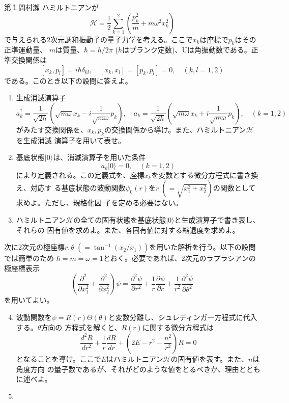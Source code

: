 \begin{question}{第１問}{村瀬}
ハミルトニアンが
\[
  \mathcal{H}=\frac12\sum_{k=1}^2\left(\frac{p_k^2}m + m \omega^2 x_k^2\right)
\]
で与えられる2次元調和振動子の量子力学を考える。ここで$x_k$は座標で$p_k$はその正準運動量、
$m$は質量、$\hbar=h/2\pi$ ($h$はプランク定数)、Uは角振動数である。正準交換関係は
\[
  [x_k,p_l] = i\hbar\delta_{kl},\quad
  [x_k,x_l] = [p_k,p_l] = 0,\quad
  (k,l=1,2)
\]
である。このとき以下の設問に答えよ。
\begin{enumerate}
\item
  生成消滅演算子
  \[
    a_k^\dag = \frac1{\sqrt{2h}}\left(\sqrt{m\omega}x_k - i \frac1{\sqrt{m\omega}} p_k\right),\quad
    a_k      = \frac1{\sqrt{2h}}\left(\sqrt{m\omega}x_k + i \frac1{\sqrt{m\omega}} p_k\right),\quad
    (k=1,2)
  \]
  がみたす交換関係を、$x_k,p_k$の交換関係から導け。また、ハミルトニアン$\mathcal{H}$を生成消滅
  演算子を用いて表せ。
\item{}
  基底状態$|0\rangle$は、消滅演算子を用いた条件
  \[
    a_k|0\rangle=0,\quad (k=1,2)
  \]
  により定義される。この定義式を、座標$x_k$を変数とする微分方程式に書き換え、対応す
  る基底状態の波動関数$\psi_0(r)$を$r\;(=\sqrt{x_1^2+x_2^2})$の関数として求めよ。ただし、規格化因
  子を定める必要はない。
\item{}
  ハミルトニアン$\mathcal{H}$の全ての固有状態を基底状態$|0\rangle$と生成演算子で書き表し、それらの
  固有値を求めよ。また、各固有値に対する縮退度を求めよ。
\end{enumerate}
次に2次元の極座標$r,\theta\;(=\tan^{-1}(x_2/x_1))$を用いた解析を行う。以下の設問では簡単のため
$\hbar=m=\omega=1$とおく。必要であれば、2次元のラプラシアンの極座標表示
\[
  \left(\frac{\partial^2}{\partial x_1^2} + \frac{\partial^2}{\partial x_2^2}\right)\psi
  = \frac{\partial^2\psi}{\partial r^2}
  + \frac1r\frac{\partial\psi}{\partial r}
  + \frac1{r^2}\frac{\partial^2\psi}{\partial\theta^2}
\]
を用いてよい。
\begin{enumerate}
\setcounter{enumi}{3}
\item
  波動関数を$\psi=R(r)\Theta(\theta)$と変数分離し、シュレディンガ一方程式に代入する。$\theta$方向の
  方程式を解くと、$R(r)$に関する微分方程式は
  \[
    \frac{d^2R}{dr^2} + \frac1r\frac{dR}{dr}
    + \left(2E-r^2-\frac{n^2}{r^2}\right) R = 0
  \]
  となることを導け。ここで$E$はハミルトニアン$\mathcal{H}$の固有値を表す。また、$n$は角度方向
  の量子数であるが、それがどのような値をとるべきか、理由とともに述べよ。
\item{}

\end{enumerate}
\end{question}
